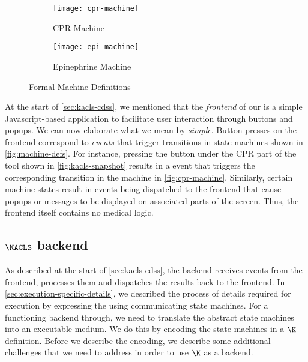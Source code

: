 \begin{figure}[tb!]
\centering
\begin{subfigure}{\textwidth}
  \centering
  \texttt{[image: cpr-machine]}
  \caption{CPR Machine}
  \label{fig:cpr-machine}
\end{subfigure}%
\hfill\newline\hfill\newline\hfill
\begin{subfigure}{\textwidth}
  \centering
  \texttt{[image: epi-machine]}
  \caption{Epinephrine Machine}
  \label{fig:epi-machine}
\end{subfigure}
\caption{Formal Machine Definitions}
\label{fig:machine-defs}
\end{figure}

At the start of \autoref{sec:kacls-cdss}, we mentioned that
the \emph{frontend} of our \CDSS{} is a simple Javascript-based
application to facilitate user interaction through buttons
and popups. We can now elaborate what we mean by \emph{simple}.
Button presses on the frontend correspond to \emph{events}
that trigger transitions in state machines shown in \autoref{fig:machine-defs}.
For instance, pressing the  button under
the CPR part of the tool shown in \autoref{fig:kacls-snapshot} results in a
 event that triggers the corresponding transition in
the machine in \autoref{fig:cpr-machine}.
Similarly, certain machine states result in events being dispatched
to the frontend that cause popups or messages to be displayed
on associated parts of the screen. Thus, the frontend itself contains
no medical logic.

\subsection{$\KACLS$ backend}\label{sec:kacls-backend}

As described at the start of \autoref{sec:kacls-cdss},
the backend receives events from the frontend, processes them and
dispatches the results back to the frontend.
In \autoref{sec:execution-specific-details}, we described the
process of details required for execution by expressing
the \BPG{} using communicating state machines. For a functioning
backend through, we need to translate the abstract state machines
into an executable medium. We do this by encoding the
state machines in a $\K$ definition. Before we describe the
encoding, we describe some additional challenges that we need
to address in order to use $\K$ as a \CDSS{} backend.

